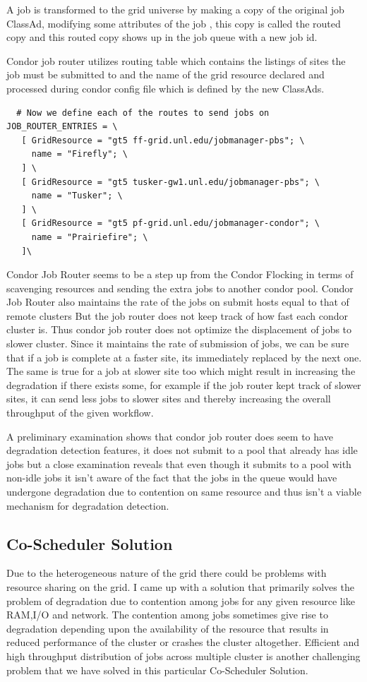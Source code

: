 \documentclass[ms,electronic,double]{nuthesis}
\begin{document}
A job is transformed to the grid universe by making a copy of the original job 
ClassAd, modifying some attributes of the job , this copy is called the routed 
copy and this routed copy shows up in the job queue with a new job id.

Condor job router utilizes routing table which contains the listings of sites 
the job must be submitted to and the name of the grid resource declared and 
processed during condor config file which is defined by the new ClassAds.

\begin{lstlisting}
  # Now we define each of the routes to send jobs on
JOB_ROUTER_ENTRIES = \
   [ GridResource = "gt5 ff-grid.unl.edu/jobmanager-pbs"; \
     name = "Firefly"; \
   ] \
   [ GridResource = "gt5 tusker-gw1.unl.edu/jobmanager-pbs"; \
     name = "Tusker"; \
   ] \
   [ GridResource = "gt5 pf-grid.unl.edu/jobmanager-condor"; \
     name = "Prairiefire"; \
   ]\

\end{lstlisting}


Condor Job Router seems to be a step up from the Condor Flocking in terms of 
scavenging resources and sending the extra jobs to another condor pool. Condor 
Job Router also maintains the rate of the jobs on submit hosts equal to that of remote clusters But the job 
router does not keep track of how fast each condor cluster is. Thus 
condor job router does not optimize the displacement of jobs to slower 
cluster. Since it maintains the rate of submission of jobs, we can be sure that if a job is complete 
at a faster site, its immediately replaced by the next one. The same is true for a job at slower site too
which might result in increasing the degradation if there exists some, for example if the job router kept track of slower sites, it
can send less jobs to slower sites and thereby increasing the overall throughput of the given workflow.

A preliminary examination shows that condor job router does seem to have degradation detection features, 
it does not submit to a pool that already has idle jobs but a close examination reveals that even though it
submits to a pool with non-idle jobs it isn't aware of the fact that the jobs in the queue would have 
undergone degradation due to contention on same resource and thus isn't a viable mechanism for degradation detection.
  
\subsection{Co-Scheduler Solution}
Due to the heterogeneous nature of the grid there could be problems with resource sharing on the grid. I 
came up with a solution that primarily solves the problem of degradation due to contention among 
jobs for any given resource like RAM,I/O and network. The contention among jobs sometimes give rise to 
degradation depending upon the availability of the resource that results in reduced performance of the cluster or crashes the cluster
altogether. Efficient and high throughput
distribution of jobs across multiple cluster is another challenging problem that we have solved in 
this particular Co-Scheduler Solution. 
\end{document}
